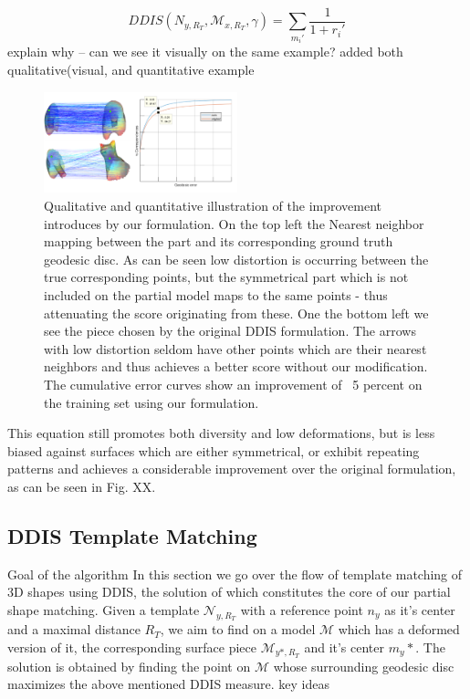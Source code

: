 \documentclass[10pt,twocolumn,letterpaper]{article}
\begin{document}
\begin{equation}
DDIS(N_{y,R_T},\mathcal{M}_{x,R_T},\gamma)=\sum_{m_i'}\frac{1}{1+r_i'}
\end{equation}
{\color{red} explain why -- can we see it visually on the same example?}{\color{magenta} added both qualitative(visual, and quantitative example}\\
\begin{figure}[htb]
	\includegraphics[width=0.5\textwidth]{figures/DDISvsWDIS.png}
	\caption{Qualitative and quantitative illustration of the improvement introduces by our formulation. On the top left the Nearest neighbor mapping between the part and its corresponding ground truth geodesic disc. As can be seen low distortion is occurring between the true corresponding points, but the symmetrical part which is not included on the partial model maps to the same points - thus attenuating the score originating from these. One the bottom left we see the piece chosen by the original DDIS formulation. The arrows with low distortion seldom have other points which are their nearest neighbors and thus achieves a better score without our modification. The cumulative error curves show an improvement of ~5 percent on the training set using our formulation.}
\end{figure}
This equation still promotes both diversity and low deformations, but is less biased against surfaces which are either symmetrical, or exhibit repeating patterns and achieves a considerable improvement over the original formulation, as can be seen in Fig. XX.

\subsection{DDIS Template Matching}
{\color{red} Goal of the algorithm}
In this section we go over the flow of template matching of 3D shapes using DDIS, the solution of which constitutes the core of our partial shape matching. Given a template $\mathcal{N}_{y,R_T}$ with a reference point $n_y$ as it's center and a maximal distance $R_T$, we aim to find on a model $\mathcal{M}$ which has a deformed version of it, the corresponding surface piece $\mathcal{M}_{y*,R_T}$ and it's center $m_y*$. The solution is obtained by finding the point on $\mathcal{M}$ whose surrounding geodesic disc maximizes the above mentioned DDIS measure.
{\color{red}key ideas}
\end{document}
